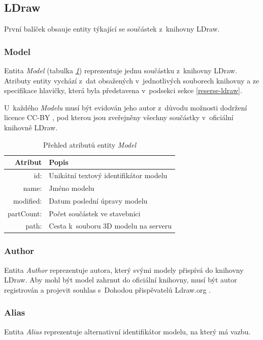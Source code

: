 \subsection{LDraw}
První balíček obsauje entity týkající se součástek z~knihovny LDraw.

\subsubsection*{Model}
  Entita \textit{Model} (tabulka \emph{\ref{table:entity:model}}) reprezentuje jednu součástku z~knihovny LDraw. Atributy entity vychází z~dat obsažených v~jednotlivých souborech knihovny a ze specifikace hlavičky, která byla představena v~podsekci \emph{} sekce \ref{reserse-ldraw}.
    
  U~každého \textit{Modelu} musí být evidován jeho autor z~důvodu možnosti dodržení licence \gls{CC-BY} \cite{CC-BY}, pod kterou jsou zveřejněny všechny součástky v~oficiální knihovně LDraw. 
  
  \begin{table}[th!]
  \centering
  \caption{Přehled atributů entity \textit{Model}}
  \label{table:entity:model}
  \begin{tabularx}{\textwidth}{@{}rX@{}}
  \toprule
  Atribut & Popis
  \\ 
  \midrule
  id: & Unikátní textový identifikátor modelu
  \\
  name: & Jméno modelu 
  \\
  modified: & Datum poslední úpravy modelu 
  \\
  partCount: & Počet součástek ve stavebnici
  \\
  path: & Cesta k~souboru 3D modelu na serveru
  \\
  \bottomrule
  \end{tabularx}
  \end{table}

\subsubsection*{Author}
Entita \textit{Author} reprezentuje autora, který svými modely přispívá do knihovny LDraw. Aby mohl být model zahrnut do oficiální knihovny, musí být autor registrován a projevit souhlas s~Dohodou přispěvatelů Ldraw.org \autocite{ldraw:agreement}.
  
\subsubsection*{Alias}
Entita \textit{Alias} reprezentuje alternativní identifikátor modelu, na který má vazbu. 

